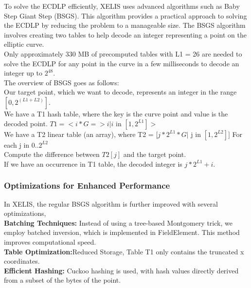 \documentclass[10pt,a4paper,twocolumn]{article}
\begin{document}
To solve the ECDLP efficiently, XELIS uses advanced algorithms such as Baby Step Giant Step (BSGS). This algorithm provides a practical approach to solving the ECDLP by reducing the problem to a manageable size. The BSGS algorithm involves creating two tables to help decode an integer representing a point on the elliptic curve. \\

Only approximately 330 MB of precomputed tables with L1 = 26 are needed to solve the ECDLP for any point in the curve in a few milliseconds to decode an integer up to \(2^{48}\).\\

The overview of BSGS goes as follows:\\

Our target point, which we want to decode, represents an integer in the range \([0, 2^{(L1 + L2)}]\).\\

We have a T1 hash table, where the key is the curve point and value is the decoded point. \(T1 = <i * G => i | i\) in \([1, 2^{L1}]>\)\\

We have a T2 linear table (an array), where T2 = \([j * 2^{L1} * G |\) j in \([1, 2^{L2}]]\)
For each j in \(0..2^{L2}\)\\

Compute the difference between \(T2[j]\) and the target point.\\

If we have an occurrence in T1 table, the decoded integer is \(j * 2^{L1} + i\).\\

\subsubsection{Optimizations for Enhanced Performance}

In XELIS, the regular BSGS algorithm is further improved with several optimizations,\\

\textbf{Batching Techniques:} Instead of using a tree-based Montgomery trick, we employ batched inversion, which is implemented in FieldElement. This method improves computational speed.\\

\textbf{Table Optimization:}Reduced Storage, Table T1 only contains the truncated x coordinates.\\

\textbf{Efficient Hashing:} Cuckoo hashing is used, with hash values directly derived from a subset of the bytes of the point.\\
\end{document}
